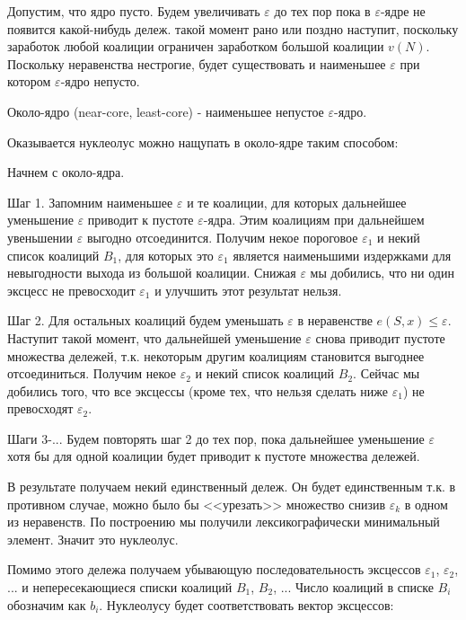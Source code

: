Допустим, что ядро пусто. Будем увеличивать $\varepsilon$ до тех пор пока в $\varepsilon$-ядре не появится какой-нибудь дележ. такой момент рано или поздно наступит, поскольку заработок любой коалиции ограничен заработком большой коалиции $v(N)$. Поскольку неравенства нестрогие, будет существовать и наименьшее $\varepsilon$ при котором $\varepsilon$-ядро непусто.

\begin{mydef}
Около-ядро  (near-core, least-core) - наименьшее непустое $\varepsilon$-ядро.
\end{mydef}

Оказывается нуклеолус можно нащупать в около-ядре таким способом:

Начнем с около-ядра. 

Шаг 1. Запомним наименьшее $\varepsilon$ и те коалиции, для которых дальнейшее уменьшение $\varepsilon$ приводит к пустоте $\varepsilon$-ядра. Этим коалициям при дальнейшем увеньшении $\varepsilon$ выгодно отсоединится.
Получим некое пороговое $\varepsilon_{1}$ и некий список коалиций $B_{1}$, для которых это $\varepsilon_{1}$ является наименьшими издержками для невыгодности выхода из большой коалиции. Снижая $\varepsilon$ мы добились, что ни один эксцесс не превосходит $\varepsilon_{1}$ и улучшить этот результат нельзя.

Шаг 2. Для остальных коалиций будем уменьшать $\varepsilon$ в неравенстве $e(S,x)\leq \varepsilon$. Наступит такой момент, что дальнейшей уменьшение $\varepsilon$ снова приводит пустоте множества дележей, т.к. некоторым другим коалициям становится выгоднее отсоединиться.
Получим некое $\varepsilon_{2}$ и некий список коалиций $B_{2}$. Сейчас мы добились того, что все эксцессы (кроме тех, что нельзя сделать ниже $\varepsilon_{1}$) не превосходят $\varepsilon_{2}$.

Шаги 3-... Будем повторять шаг 2 до тех пор, пока дальнейшее уменьшение $\varepsilon$ хотя бы для одной коалиции будет приводит к пустоте множества дележей.

В результате получаем некий единственный дележ. Он будет единственным т.к. в противном случае, можно было бы <<урезать>>  множество снизив $\varepsilon_{k}$ в одном из неравенств. По построению мы получили лексикографически минимальный элемент. Значит это нуклеолус.


Помимо этого дележа получаем убывающую последовательность эксцессов $\varepsilon_{1}$, $\varepsilon_{2}$, ... и непересекающиеся списки коалиций $B_{1}$, $B_{2}$, ... Число коалиций в списке $B_{i}$ обозначим как $b_{i}$. Нуклеолусу будет соответствовать вектор эксцессов:

